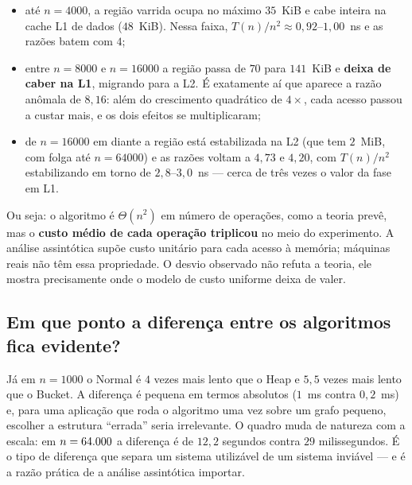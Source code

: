 \documentclass[12pt,a4paper]{article}
\begin{document}
\begin{itemize}
  \item até $n = 4000$, a região varrida ocupa no máximo $35$~KiB e cabe
        inteira na cache L1 de dados ($48$~KiB). Nessa faixa,
        $T(n)/n^2 \approx 0{,}92$--$1{,}00$~ns e as razões batem com $4$;
  \item entre $n = 8000$ e $n = 16000$ a região passa de $70$ para
        $141$~KiB e \textbf{deixa de caber na L1}, migrando para a L2. É
        exatamente aí que aparece a razão anômala de $8{,}16$: além do
        crescimento quadrático de $4\times$, cada acesso passou a custar
        mais, e os dois efeitos se multiplicaram;
  \item de $n = 16000$ em diante a região está estabilizada na L2 (que tem
        $2$~MiB, com folga até $n = 64000$) e as razões voltam a $4{,}73$ e
        $4{,}20$, com $T(n)/n^2$ estabilizando em torno de $2{,}8$--$3{,}0$~ns
        --- cerca de três vezes o valor da fase em L1.
\end{itemize}

Ou seja: o algoritmo é $\Theta(n^2)$ em número de operações, como a teoria
prevê, mas o \textbf{custo médio de cada operação triplicou} no meio do
experimento. A análise assintótica supõe custo unitário para cada acesso à
memória; máquinas reais não têm essa propriedade. O desvio observado não
refuta a teoria, ele mostra precisamente onde o modelo de custo uniforme deixa
de valer.

\subsection{Em que ponto a diferença entre os algoritmos fica evidente?}

Já em $n = 1000$ o Normal é $4$ vezes mais lento que o Heap e $5{,}5$ vezes
mais lento que o Bucket. A diferença é pequena em termos absolutos
($1$~ms contra $0{,}2$~ms) e, para uma aplicação que roda o algoritmo uma vez
sobre um grafo pequeno, escolher a estrutura ``errada'' seria irrelevante. O
quadro muda de natureza com a escala: em $n = 64.000{}$ a diferença é de
$12{,}2$ segundos contra $29$ milissegundos. É o tipo de diferença que separa
um sistema utilizável de um sistema inviável --- e é a razão prática de a
análise assintótica importar.
\end{document}
